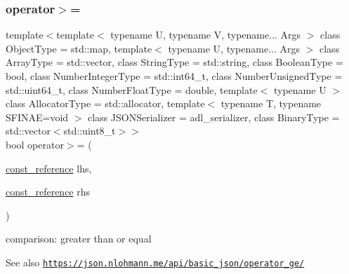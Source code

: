 \subsubsection{\texorpdfstring{operator$>$=}{operator>=}\hspace{0.1cm}{\footnotesize\ttfamily [1/3]}}
{\footnotesize\ttfamily template$<$template$<$ typename U, typename V, typename... Args $>$ class Object\+Type = std\+::map, template$<$ typename U, typename... Args $>$ class Array\+Type = std\+::vector, class String\+Type  = std\+::string, class Boolean\+Type  = bool, class Number\+Integer\+Type  = std\+::int64\+\_\+t, class Number\+Unsigned\+Type  = std\+::uint64\+\_\+t, class Number\+Float\+Type  = double, template$<$ typename U $>$ class Allocator\+Type = std\+::allocator, template$<$ typename T, typename S\+F\+I\+N\+A\+E=void $>$ class J\+S\+O\+N\+Serializer = adl\+\_\+serializer, class Binary\+Type  = std\+::vector$<$std\+::uint8\+\_\+t$>$$>$ \\
bool operator$>$= (\begin{DoxyParamCaption}\item[{\hyperlink{classnlohmann_1_1basic__json_ab8a1c33ee7b154fc41ca2545aa9724e6}{const\+\_\+reference}}]{lhs,  }\item[{\hyperlink{classnlohmann_1_1basic__json_ab8a1c33ee7b154fc41ca2545aa9724e6}{const\+\_\+reference}}]{rhs }\end{DoxyParamCaption})\hspace{0.3cm}{\ttfamily [friend]}}



comparison\+: greater than or equal 

\begin{DoxySeeAlso}{See also}
\href{https://json.nlohmann.me/api/basic_json/operator_ge/}{\tt https\+://json.\+nlohmann.\+me/api/basic\+\_\+json/operator\+\_\+ge/} 
\end{DoxySeeAlso}
\mbox{\label{classnlohmann_1_1basic__json_ab83d11de4db25633f93e067aa218cae9}} 
